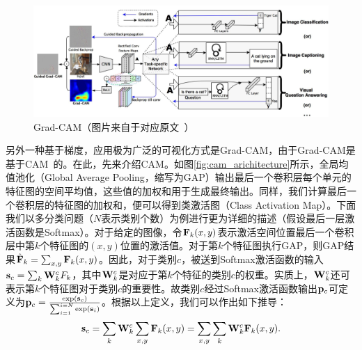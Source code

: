 \begin{figure}[h]
	\centering
	\includegraphics[width=1.0\textwidth]{figure/grad_cam_architecture}
	\caption{Grad-CAM（图片来自于对应原文~\cite{selvaraju2017grad}）}
	\label{fig:grad_cam_architecture}
\end{figure}
另外一种基于梯度，应用极为广泛的可视化方式是Grad-CAM，由于Grad-CAM是基于CAM~\cite{zhou2016learning}的。在此，先来介绍CAM。如图\ref{fig:cam_arichitecture}所示，全局均值池化（Global Average Pooling，缩写为GAP）输出最后一个卷积层每个单元的特征图的空间平均值，这些值的加权和用于生成最终输出。同样，我们计算最后一个卷积层的特征图的加权和，便可以得到类激活图（Class Activation Map）。下面我们以多分类问题（$N$表示类别个数）为例进行更为详细的描述（假设最后一层激活函数是Softmax）。对于给定的图像，令$\mathbf{F}_k(x, y)$表示激活空间位置最后一个卷积层中第$k$个特征图的$(x,y)$位置的激活值。对于第$k$个特征图执行GAP，则GAP结果$\hat{\mathbf{F}}_k=\sum_{x, y} \mathbf{F}_{k}(x,y)$。因此，对于类别$c$，被送到Softmax激活函数的输入$\mathbf{s}_c=\sum_{k} \mathbf{W}_{k}^{c} F_{k}$，其中$\mathbf{W}_k^c$是对应于第$k$个特征的类别$c$的权重。实质上，$\mathbf{W}_{k}^{c}$还可表示第$k$个特征图对于类别$c$的重要性。故类别$c$经过Softmax激活函数输出${\mathbf{p}}_c$可定义为$\mathbf{p}_c=\frac{\exp \left(\mathbf{s}_{c}\right)}{\sum_{i=1}^{i=N} \exp \left(\mathbf{s}_{i}\right)}$。根据以上定义，我们可以作出如下推导：
\begin{equation*}
\mathbf{s}_{c}=\sum_{k} \mathbf{W}_{k}^{c} \sum_{x, y} \mathbf{F}_{k}(x, y)=\sum_{x, y} \sum_{k} \mathbf{W}_{k}^{c} \mathbf{F}_{k}(x, y).
\end{equation*}
